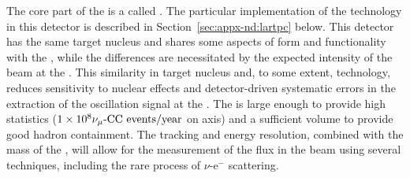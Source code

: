 The core part of the   is a  called .  The particular implementation of the  technology in this detector is described in Section~\ref{sec:appx-nd:lartpc} below.  
This detector has the same target nucleus and shares some aspects of form and functionality with the , while the differences are necessitated by the expected intensity of the beam at the .  This similarity in target nucleus and, to some extent, technology, reduces sensitivity to nuclear effects and detector-driven systematic errors in the extraction of the oscillation signal at the  .  The  is large enough to provide high statistics ($\num{1e8}{\numu \text{-CC events/year}}$ on axis) and a sufficient volume to provide good hadron containment.  The tracking and energy resolution, combined with the mass of the , will allow for the measurement of the flux in the beam using several techniques, including the rare process of $\nu$-e$^{-}$ scattering.




